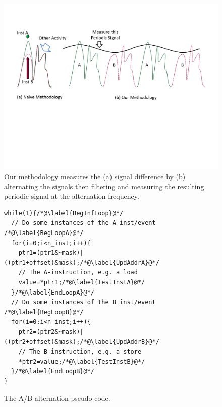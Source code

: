\begin{figure}[htb]
\centering
\includegraphics[trim=0.6in 3.5in 0.6in 1.3in,clip,width=6in]{../savat_final/Drawing/PeriodicSignal.pdf}
\caption{Our methodology measures the (a) signal difference by (b) alternating the signals then filtering and measuring the resulting periodic signal at the alternation frequency.}
\label{PeriodicSignal}
\end{figure}



\begin{figure}[htb]
  \centering
\lstset{language=C++,basicstyle=\ttfamily\small,numbers=left}
\begin{lstlisting}[frame=none,xleftmargin=30pt]
while(1){/*@\label{BegInfLoop}@*/
  // Do some instances of the A inst/event /*@\label{BegLoopA}@*/
  for(i=0;i<n_inst;i++){
    ptr1=(ptr1&~mask)|((ptr1+offset)&mask);/*@\label{UpdAddrA}@*/
    // The A-instruction, e.g. a load
    value=*ptr1;/*@\label{TestInstA}@*/
  }/*@\label{EndLoopA}@*/
  // Do some instances of the B inst/event /*@\label{BegLoopB}@*/
  for(i=0;i<n_inst;i++){
    ptr2=(ptr2&~mask)|((ptr2+offset)&mask);/*@\label{UpdAddrB}@*/
    // The B-instruction, e.g. a store
    *ptr2=value;/*@\label{TestInstB}@*/
  }/*@\label{EndLoopB}@*/
}
\end{lstlisting}
\caption{The A/B alternation pseudo-code.}\label{pseudocode}
\end{figure}

